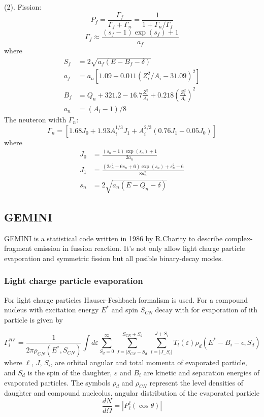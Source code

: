 \par
(2). Fission: 
\begin{equation}
	P_f = \frac{\Gamma_f}{\Gamma_f+\Gamma_n}=\frac{1}{1+\Gamma_n/\Gamma_f} 
\end{equation}
\begin{equation}
	\Gamma_f \approx \frac{\left(s_f-1\right)\exp\left(s_f\right)+1}{a_f} 
\end{equation}
where
\begin{align*}
	S_f &=2\sqrt{a_f\left(E-B_f-\delta\right)}\\
	a_f &=a_n\left[1.09+0.011\left(Z_i^2/A_i-31.09\right)^2\right]\\
	B_f &=Q_n+321.2-16.7\frac{Z_i^2}{A_i}+0.218\left(\frac{Z_i^2}{A_i}\right)^2\\
	a_n &=\left(A_i-1\right)/8
\end{align*}
The neuteron width $\Gamma_n$:
\begin{equation}
	\Gamma_n = \left[1.68J_0+1.93A_i^{1/3}J_1+A_i^{2/3}(0.76J_1-0.05J_0)\right]
\end{equation}
where
\begin{align*}
	J_0 &=\frac{\left(s_n-1\right)\exp\left(s_n\right)+1}{2a_n}\\
	J_1 &=\frac{\left(2s_n^2-6s_n+6\right)\exp\left(s_n\right)+s_n^2-6}{8a_n^2}\\
	s_n &=2\sqrt{a_n\left(E-Q_n-\delta\right)}
\end{align*}
\subsection{GEMINI}
GEMINI is a statistical code written in 1986 by R.Charity\cite{CHARITY1988,Charity2010} to describe complex-fragment emission in fussion reaction. It's not only allow light charge particle evaporation and symmetric fission but all posible binary-decay modes.
\subsubsection{Light charge particle evaporation}
For light charge particles Hauser-Feshbach formalism is used. For a compound nucleus with excitation energy $E^*$ and spin $S_{CN}$ decay with for evaporation of ith particle is given by

\begin{equation}
	\Gamma_i^{HF}=\frac{1}{2\pi\rho_{CN}\left(E^*,S_{CN}\right)}\int d\varepsilon\sum_{S_d=0}^{\infty}\sum_{J=\left|S_{CN}-S_d\right|}^{S_{CN}+S_d}\sum_{l=\left|J_-S_i\right|}^{J+S_i}T_l(\varepsilon)\rho_{d}\left(E^*-B_i-\epsilon,S_d\right)
\end{equation}
where $\ell$, $J$, $S_i$, are orbital angular and total momenta of evaporated particle, and $S_d$ is the spin of the daughter, $\varepsilon$ and $B_i$ are kinetic and separation energies of evaporated particles. The symbols $\rho_d$ and $\rho_{CN}$ represent the level densities of daughter and compound nucleolus.
angular distribution of the evaporated particle
\begin{equation}
	\frac{dN}{d\Omega}=\left|P_\ell^\ell\left(\cos\theta\right)\right|
\end{equation}
